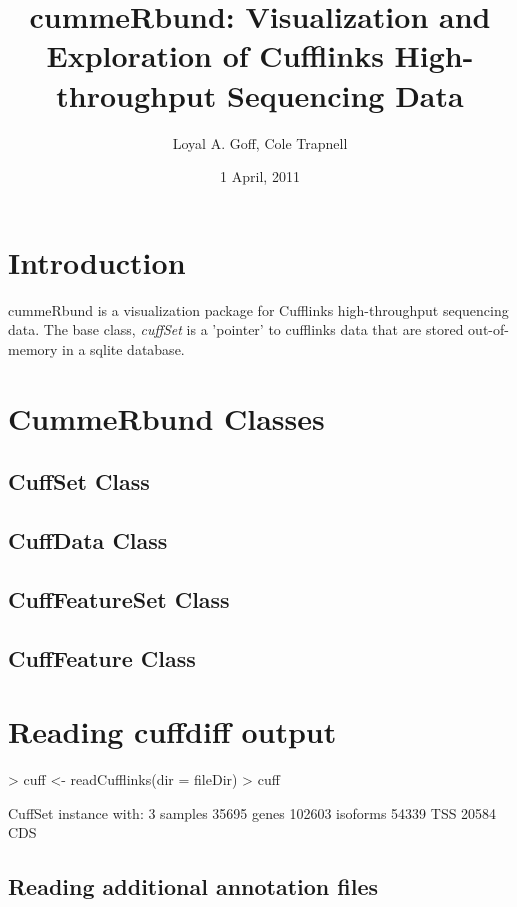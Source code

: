 \documentclass[10pt]{article}
\title{cummeRbund: Visualization and Exploration of Cufflinks High-throughput Sequencing Data}
\author{Loyal A. Goff, Cole Trapnell}
\date{1 April, 2011}
\newcommand{\Rpackage}[1]{\textsf{#1}}
\newcommand{\Rclass}[1]{{\textit{#1}}}
\begin{document}
\maketitle

\tableofcontents

\section{Introduction}
	\Rpackage{cummeRbund} is a visualization package for Cufflinks high-throughput sequencing data. The base class, \Rclass{cuffSet} 
	is a 'pointer' to cufflinks data that are stored out-of-memory in a sqlite database.
	
\section{CummeRbund Classes}

\subsection{CuffSet Class}

\subsection{CuffData Class}

\subsection{CuffFeatureSet Class}

\subsection{CuffFeature Class}
	
\section{Reading cuffdiff output}
\begin{Schunk}
\begin{Sinput}
> cuff <- readCufflinks(dir = fileDir)
> cuff
\end{Sinput}
\begin{Soutput}
CuffSet instance with:
	 3 samples
	 35695 genes
	 102603 isoforms
	 54339 TSS
	 20584 CDS
\end{Soutput}
\end{Schunk}

\subsection{Reading additional annotation files}
\end{document}
